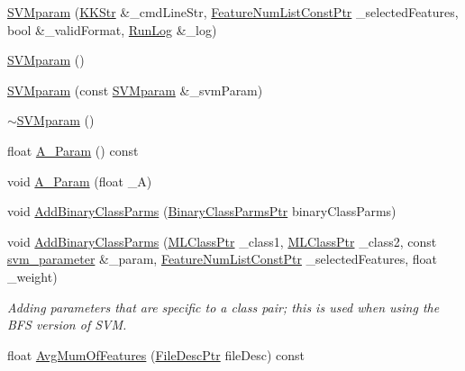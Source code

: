 \begin{DoxyCompactItemize}
\item 
\hyperlink{class_k_k_m_l_l_1_1_s_v_mparam_acd0bbf497520f9f645006c443d8357cf}{S\+V\+Mparam} (\hyperlink{class_k_k_b_1_1_k_k_str}{K\+K\+Str} \&\+\_\+cmd\+Line\+Str, \hyperlink{namespace_k_k_m_l_l_a81284b0a14973267260023f9a72da94a}{Feature\+Num\+List\+Const\+Ptr} \+\_\+selected\+Features, bool \&\+\_\+valid\+Format, \hyperlink{class_k_k_b_1_1_run_log}{Run\+Log} \&\+\_\+log)
\item 
\hyperlink{class_k_k_m_l_l_1_1_s_v_mparam_af45d964ab5bf227e5b40973b3638aa81}{S\+V\+Mparam} ()
\item 
\hyperlink{class_k_k_m_l_l_1_1_s_v_mparam_aefebc0bea32719ed11f308b48bc35fa7}{S\+V\+Mparam} (const \hyperlink{class_k_k_m_l_l_1_1_s_v_mparam}{S\+V\+Mparam} \&\+\_\+svm\+Param)
\item 
\hyperlink{class_k_k_m_l_l_1_1_s_v_mparam_af9b67e2bfd088f283bcef2c4232b0bcc}{$\sim$\+S\+V\+Mparam} ()
\item 
float \hyperlink{class_k_k_m_l_l_1_1_s_v_mparam_a18270c5117ee0c817974cf084452b4ec}{A\+\_\+\+Param} () const 
\item 
void \hyperlink{class_k_k_m_l_l_1_1_s_v_mparam_a1791100f8a340b67ac0b48464d8fd90f}{A\+\_\+\+Param} (float \+\_\+A)
\item 
void \hyperlink{class_k_k_m_l_l_1_1_s_v_mparam_a7106733ffbda73236008e71baf95b129}{Add\+Binary\+Class\+Parms} (\hyperlink{namespace_k_k_m_l_l_aca399c0744e11553270ffaca507cfee7}{Binary\+Class\+Parms\+Ptr} binary\+Class\+Parms)
\item 
void \hyperlink{class_k_k_m_l_l_1_1_s_v_mparam_a39c75fd4febfba99372e36e648574e3c}{Add\+Binary\+Class\+Parms} (\hyperlink{namespace_k_k_m_l_l_ac272393853d59e72e8456f14cd6d8c23}{M\+L\+Class\+Ptr} \+\_\+class1, \hyperlink{namespace_k_k_m_l_l_ac272393853d59e72e8456f14cd6d8c23}{M\+L\+Class\+Ptr} \+\_\+class2, const \hyperlink{struct_s_v_m233_1_1svm__parameter}{svm\+\_\+parameter} \&\+\_\+param, \hyperlink{namespace_k_k_m_l_l_a81284b0a14973267260023f9a72da94a}{Feature\+Num\+List\+Const\+Ptr} \+\_\+selected\+Features, float \+\_\+weight)
\begin{DoxyCompactList}\small\item\em Adding parameters that are specific to a class pair; this is used when using the B\+FS version of S\+VM. \end{DoxyCompactList}\item 
float \hyperlink{class_k_k_m_l_l_1_1_s_v_mparam_a58807d8d010cdf96986a08b2d0ccc872}{Avg\+Mum\+Of\+Features} (\hyperlink{namespace_k_k_m_l_l_aa0d0b6ab4ec18868a399b8455b05d914}{File\+Desc\+Ptr} file\+Desc) const 

\end{DoxyCompactItemize}
